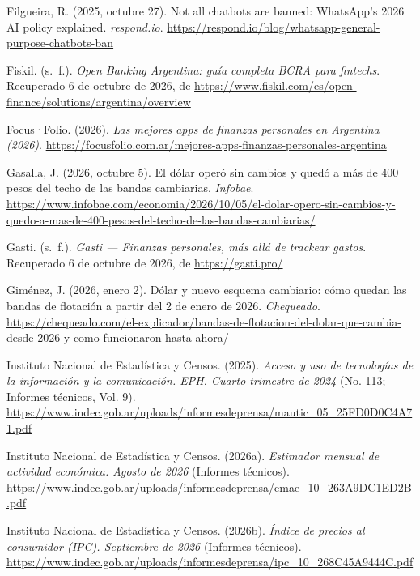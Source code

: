 \begin{CSLReferences}{1}{0}
Filgueira, R. (2025, octubre 27). Not all chatbots are banned:
WhatsApp's 2026 AI policy explained. \emph{respond.io}.
\url{https://respond.io/blog/whatsapp-general-purpose-chatbots-ban}

Fiskil. (s.~f.). \emph{Open Banking Argentina: guía completa BCRA para
fintechs}. Recuperado 6 de octubre de 2026, de
\url{https://www.fiskil.com/es/open-finance/solutions/argentina/overview}

Focus·Folio. (2026). \emph{Las mejores apps de finanzas personales en
Argentina (2026)}.
\url{https://focusfolio.com.ar/mejores-apps-finanzas-personales-argentina}

Gasalla, J. (2026, octubre 5). El dólar operó sin cambios y quedó a más
de 400 pesos del techo de las bandas cambiarias. \emph{Infobae}.
\url{https://www.infobae.com/economia/2026/10/05/el-dolar-opero-sin-cambios-y-quedo-a-mas-de-400-pesos-del-techo-de-las-bandas-cambiarias/}

Gasti. (s.~f.). \emph{Gasti --- Finanzas personales, más allá de
trackear gastos}. Recuperado 6 de octubre de 2026, de
\url{https://gasti.pro/}

Giménez, J. (2026, enero 2). Dólar y nuevo esquema cambiario: cómo
quedan las bandas de flotación a partir del 2 de enero de 2026.
\emph{Chequeado}.
\url{https://chequeado.com/el-explicador/bandas-de-flotacion-del-dolar-que-cambia-desde-2026-y-como-funcionaron-hasta-ahora/}

Instituto Nacional de Estadística y Censos. (2025). \emph{Acceso y uso
de tecnologías de la información y la comunicación. EPH. Cuarto
trimestre de 2024} (No. 113; Informes técnicos, Vol. 9).
\url{https://www.indec.gob.ar/uploads/informesdeprensa/mautic_05_25FD0D0C4A71.pdf}

Instituto Nacional de Estadística y Censos. (2026a). \emph{Estimador
mensual de actividad económica. Agosto de 2026} (Informes técnicos).
\url{https://www.indec.gob.ar/uploads/informesdeprensa/emae_10_263A9DC1ED2B.pdf}

Instituto Nacional de Estadística y Censos. (2026b). \emph{Índice de
precios al consumidor (IPC). Septiembre de 2026} (Informes técnicos).
\url{https://www.indec.gob.ar/uploads/informesdeprensa/ipc_10_268C45A9444C.pdf}


\end{CSLReferences}
